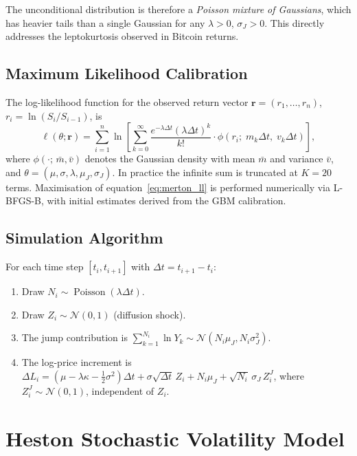 \documentclass[12pt, a4paper, oneside]{report}
\theoremstyle{plain}
\theoremstyle{definition}
\theoremstyle{remark}
\begin{document}
The unconditional distribution is therefore a \emph{Poisson mixture of Gaussians},
which has heavier tails than a single Gaussian for any $\lambda > 0$, $\sigma_J > 0$.
This directly addresses the leptokurtosis observed in Bitcoin returns.

\subsection{Maximum Likelihood Calibration}

The log-likelihood function for the observed return vector $\mathbf{r} = (r_1, \ldots, r_n)$,
$r_i = \ln(S_i/S_{i-1})$, is
\begin{equation}
\label{eq:merton_ll}
  \ell(\theta; \mathbf{r}) = \sum_{i=1}^n \ln \!\left[
    \sum_{k=0}^{\infty}
    \frac{e^{-\lambda\Delta t}(\lambda\Delta t)^k}{k!}
    \cdot \phi\!\left(r_i;\; m_k\Delta t,\; v_k\Delta t\right)
  \right],
\end{equation}
where $\phi(\cdot;\, \bar m, \bar v)$ denotes the Gaussian density with mean $\bar m$
and variance $\bar v$, and $\theta = (\mu, \sigma, \lambda, \mu_J, \sigma_J)$.
In practice the infinite sum is truncated at $K = 20$ terms.  Maximisation of
equation~\eqref{eq:merton_ll} is performed numerically via L-BFGS-B, with initial
estimates derived from the GBM calibration.

\subsection{Simulation Algorithm}

For each time step $[t_i, t_{i+1}]$ with $\Delta t = t_{i+1} - t_i$:
\begin{enumerate}[leftmargin=1.25cm, label=\arabic*.]
  \item Draw $N_i \sim \operatorname{Poisson}(\lambda\Delta t)$.
  \item Draw $Z_i \sim \mathcal{N}(0,1)$ (diffusion shock).
  \item The jump contribution is
    $\sum_{k=1}^{N_i}\ln Y_k \sim \mathcal{N}(N_i\mu_J, N_i\sigma_J^2)$.
  \item The log-price increment is
    $\Delta L_i = (\mu - \lambda\kappa - \frac{1}{2}\sigma^2)\Delta t
    + \sigma\sqrt{\Delta t}\,Z_i + N_i\mu_J + \sqrt{N_i}\,\sigma_J\,Z_i^J$,
    where $Z_i^J \sim \mathcal{N}(0,1)$, independent of $Z_i$.
\end{enumerate}

\section{Heston Stochastic Volatility Model}
\label{sec:heston}
\end{document}
